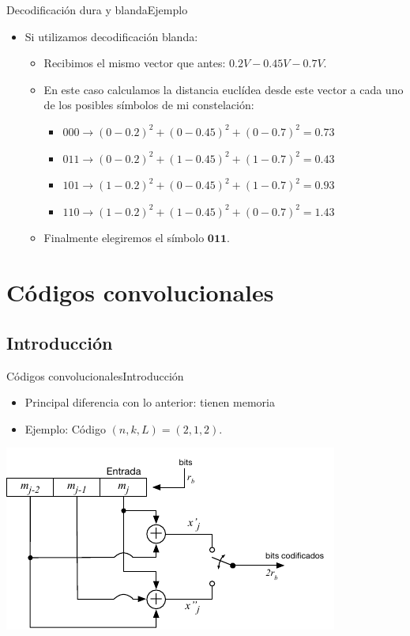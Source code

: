 \documentclass[10pt,compress]{beamer} %
\begin{document}
\begin{frame}{Decodificación dura y blanda}{Ejemplo}
  \begin{itemize}
    \item Si utilizamos decodificación blanda: 
    \begin{itemize}
      \item Recibimos el mismo vector que antes: $0.2V - 0.45V-0.7V$.
      \item En este caso calculamos la distancia euclídea desde este vector a cada uno de los posibles símbolos de mi constelación:
      \begin{itemize}
        \item $000 \rightarrow (0 - 0.2)^2 + (0-0.45)^2 + (0-0.7)^2 = 0.73$
        \item $011 \rightarrow (0 - 0.2)^2 + (1-0.45)^2 + (1-0.7)^2 = 0.43$
        \item $101 \rightarrow (1 - 0.2)^2 + (0-0.45)^2 + (1-0.7)^2 = 0.93$
        \item $110 \rightarrow (1 - 0.2)^2 + (1-0.45)^2 + (0-0.7)^2 = 1.43$
      \end{itemize}
      \item Finalmente elegiremos el símbolo $\mathbf{011}$.
    \end{itemize}
  \end{itemize}
\end{frame}

\section{Códigos convolucionales}
\subsection{Introducción}
\begin{frame}{Códigos convolucionales}{Introducción}
  \begin{itemize}
    \item Principal diferencia con lo anterior: tienen memoria
    \item Ejemplo: Código $(n,k,L) = (2,1,2)$.
  \end{itemize}
  \centering \includegraphics[width=0.8\linewidth]{../Apuntes/Figuras/CodificadorConvolucional.pdf}
\end{frame}
\end{document}
